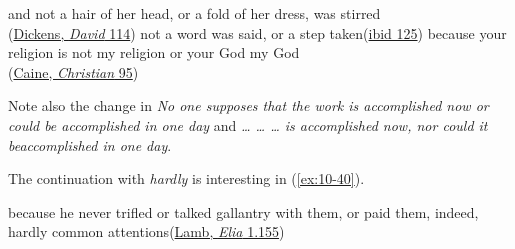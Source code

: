  \z
\z
\ea \label{ex:unnatural-or2}
 \ea
 and not a hair of her head, or a fold of her dress, was stirred\\\hfill(\href{https://archive.org/details/personalhistory05dickgoog/page/n55/mode/2up?q=%22hair+of+her+head%22&view=theater}{Dickens, \textit{David} 114})
 \ex
 not a word was said, or a step taken\hfill(\href{https://archive.org/details/personalhistory05dickgoog/page/n59/mode/2up?q=%22word+was+said%22&view=theater}{ibid 125})
 \ex
 because your religion is not my religion or your God my God\\\hfill(\href{https://archive.org/details/christianstory00cainrich/page/112/mode/2up?q=%22your+religion+is+not%22&view=theater}{Caine, \textit{Christian} 95})
 \z
\z

Note also the change in \textit{No one supposes that the work is accomplished now or could be accomplished in one day} and \textit{{\dots} {\dots} {\dots} is accomplished now, nor could it be\hfill accomplished in one day}.

The continuation with \textit{hardly} is interesting in (\ref{ex:10-40}).

\ea \label{ex:10-40}
because he never trifled or talked gallantry with them, or paid them, indeed, hardly common attentions\hfill(\href{https://archive.org/details/essayseliacharle00lamb/page/100/mode/2up?q=%22never+trifled+or+talked+gallantry%22&view=theater}{Lamb, \textit{Elia} 1.155})
\z
{}

